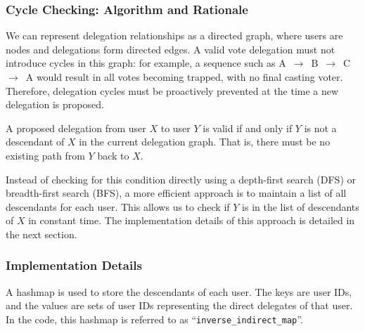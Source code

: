 \subsubsection*{Cycle Checking: Algorithm and Rationale}
We can represent delegation relationships as a directed graph, where users are nodes and delegations form directed edges. A valid vote delegation must not introduce cycles in this graph: for example, a sequence such as A~$\rightarrow$~B~$\rightarrow$~C~$\rightarrow$~A would result in all votes becoming trapped, with no final casting voter. Therefore, delegation cycles must be proactively prevented at the time a new delegation is proposed.

A proposed delegation from user $X$ to user $Y$ is valid if and only if $Y$ is not a descendant of $X$ in the current delegation graph. That is, there must be no existing path from $Y$ back to $X$.



Instead of checking for this condition directly using a depth-first search (DFS) or breadth-first search (BFS), a more efficient approach is to maintain a list of all descendants for each user. This allows us to check if $Y$ is in the list of descendants of $X$ in constant time. The implementation details of this approach is detailed in the next section.

\subsubsection{Implementation Details}
A hashmap is used to store the descendants of each user. The keys are user IDs, and the values are sets of user IDs representing the direct delegates of that user. In the code, this hashmap is referred to as ``\verb|inverse_indirect_map|''.

